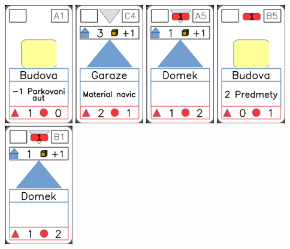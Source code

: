 \documentclass[a4paper]{article}
\begin{document}
	\includegraphics[width=3.0cm]{img-2_0}
	\includegraphics[width=3.0cm]{img-3_13}
	\includegraphics[width=3.0cm]{img-3_4}
	\includegraphics[width=3.0cm]{img-2_9}
	\includegraphics[width=3.0cm]{img-3_5}
\end{document}
